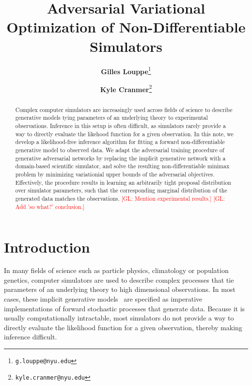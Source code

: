 \documentclass[twocolumn,superscriptaddress,aps]{revtex4-1}
\newcommand{\glnote}[1]{\textcolor{red}{[GL: #1]}}
\theoremstyle{plain}
\begin{document}

\title{\Large{Adversarial Variational Optimization of Non-Differentiable Simulators}}
\vspace{1cm}
\author{\small{\bf Gilles Louppe}\thanks{\texttt{g.louppe@nyu.edu}}}
\author{\small{\bf Kyle Cranmer}\thanks{\texttt{kyle.cranmer@nyu.edu}}}

\begin{abstract}

Complex computer simulators are increasingly used across fields of science to
describe generative models tying parameters of an underlying theory to
experimental observations. Inference in this setup is often
difficult, as simulators rarely provide a way to directly evaluate the likehood
function for a given observation. In this note, we develop a likelihood-free
inference algorithm for fitting a forward non-differentiable generative model to
observed data. We adapt the adversarial training procedure of generative
adversarial networks by replacing the implicit generative network with a
domain-based scientific simulator, and solve the resulting non-differentiable
minimax problem by minimizing variationial upper bounds of the adversarial objectives.
Effectively, the procedure results in learning an arbitrarily tight
proposal distribution over simulator parameters, such that the corresponding
marginal distribution of the generated data matches the observations.
\glnote{Mention experimental results.}
\glnote{Add 'so what?' conclusion.}


\end{abstract}

\maketitle


\section{Introduction}

In many fields of science such as particle physics, climatology or population
genetics, computer simulators are used to describe complex processes that tie
parameters of an underlying theory to high dimensional observations. In most
cases, these implicit generative models~\citep{2016arXiv161003483M} are
specified as imperative implementations of forward stochastic processes that
generate data. Because it is usually computationally intractable, most simulators
do not provide a way to directly evaluate the likelihood function for a
given observation, thereby making inference difficult.
\end{document}
